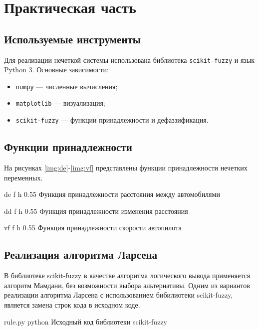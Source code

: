 \chapter{Практическая часть}

\section{Используемые инструменты}

Для реализации нечеткой системы использована библиотека \texttt{scikit-fuzzy} и язык
 Python 3.  
Основные зависимости:
\begin{itemize}
    \item \texttt{numpy} — численные вычисления;
    \item \texttt{matplotlib} — визуализация;
    \item \texttt{scikit-fuzzy} — функции принадлежности и дефаззификация.
\end{itemize}

\section{Функции принадлежности}

На рисунках \ref{img:de}-\ref{img:vf} представлены функции 
принадлежности нечетких переменных.

    {de}
    {f}
    {h}
    {0.55\textwidth}
    {Функция принадлежности расстояния между автомобилями}

    {dd}
    {f}
    {h}
    {0.55\textwidth}
    {Функция принадлежности изменения расстояния}

    {vf}
    {f}
    {h}
    {0.55\textwidth}
    {Функция принадлежности скорости автопилота}

\section{Реализация алгоритма Ларсена}

В библиотеке scikit-fuzzy в качестве алгоритма логического вывода применяется
алгоритм Мамдани, без возможности выбора альтернативы. 
Одним из вариантов реализации алгоритма Ларсена с использованием бибилиотеки
scikit-fuzzy, является замена строк кода в исходном коде.

{rule.py} %
{python} %
{Исходный код библиотеки scikit-fuzzy} %

